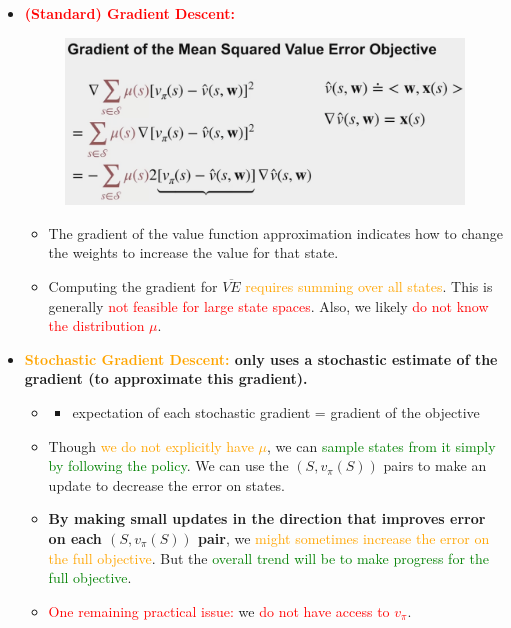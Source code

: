\documentclass[12pt, a4paper]{article}
\begin{document}
\begin{itemize}

  \item \textbf{\textcolor{red}{(Standard) Gradient Descent:}}
  \begin{figure}[H]
    \centering
      \includegraphics[width=0.8\columnwidth]{images/gradient-for-mse.png}
      \label{fig:gradient-for-mse}
  \end{figure}

  \begin{itemize}
    \item The gradient of the value function approximation indicates how to change the weights to increase the value for that state.
    \item Computing the gradient for $\overline{VE}$ \textcolor{Orange}{requires summing over all states}. This is generally \textcolor{red}{not feasible for large state spaces}. Also, we likely \textcolor{red}{do not know the distribution $\mu$}.
  \end{itemize}

  \item \textbf{\textcolor{Orange}{Stochastic Gradient Descent:} only uses a stochastic estimate of the gradient (to approximate this gradient).}

  \begin{itemize}
    \item[]
    \begin{itemize}
      \item expectation of each stochastic gradient = gradient of the objective
    \end{itemize}

    \item Though \textcolor{Orange}{we do not explicitly have $\mu$}, we can \textcolor{Green}{sample states from it simply by following the policy}. We can use the $(S, v_\pi(S))$ pairs to make an update to decrease the error on states.
    \item \textbf{By making small updates in the direction that improves error on each $(S, v_\pi(S))$ pair}, we \textcolor{Orange}{might sometimes increase the error on the full objective}. But the \textcolor{Green}{overall trend will be to make progress for the full objective}.
    \item \textcolor{red}{One remaining practical issue:} we \textcolor{red}{do not have access to $v_\pi$}.


\end{itemize}
\end{itemize}
\end{document}

